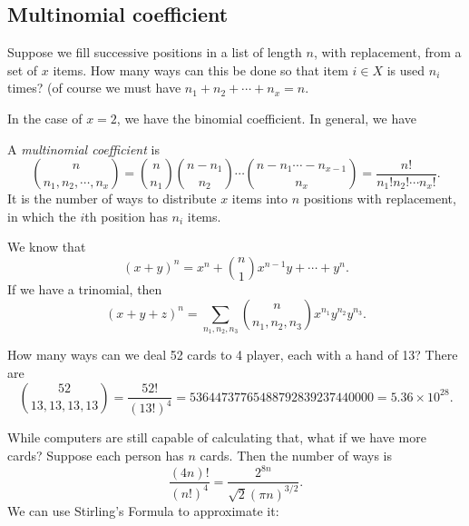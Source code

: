 \documentclass[a4paper]{article}
\begin{document}
\subsection{Multinomial coefficient}
Suppose we fill successive positions in a list of length $n$, with replacement, from a set of $x$ items. How many ways can this be done so that item $i\in X$ is used $n_i$ times? (of course we must have $n_1 + n_2 + \cdots + n_x = n$.

In the case of $x = 2$, we have the binomial coefficient. In general, we have
\begin{defi}
  A \emph{multinomial coefficient} is
  \[
    \binom{n}{n_1, n_2, \cdots, n_x} = \binom{n}{n_1}\binom{n - n_1}{n_2}\cdots \binom{n - n_1\cdots - n_{x - 1}}{n_x} = \frac{n!}{n_1!n_2!\cdots n_x!}.
  \]
  It is the number of ways to distribute $x$ items into $n$ positions with replacement, in which the $i$th position has $n_i$ items.
\end{defi}

\begin{eg}
  We know that
  \[
    (x + y)^n = x^n + \binom{n}{1}x^{n - 1}y + \cdots + y^n.
  \]
  If we have a trinomial, then
  \[
    (x + y + z)^n = \sum_{n_1, n_2, n_3} \binom{n}{n_1, n_2, n_3} x^{n_1}y^{n_2}y^{n_3}.
  \]
\end{eg}

\begin{eg}
  How many ways can we deal 52 cards to 4 player, each with a hand of 13? There are
  \[
    \binom{52}{13, 13, 13, 13} = \frac{52!}{(13!)^4} = 53644737765488792839237440000 = 5.36\times 10^{28}.
  \]
\end{eg}
While computers are still capable of calculating that, what if we have more cards? Suppose each person has $n$ cards. Then the number of ways is
\[
  \frac{(4n)!}{(n!)^4} = \frac{2^{8n}}{\sqrt{2} (\pi n)^{3/2}}.
\]
We can use Stirling's Formula to approximate it:
\end{document}
